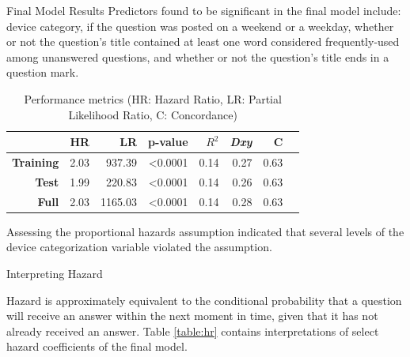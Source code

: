 \documentclass[final]{beamer}
\newlength{\onecolwid}
\newlength{\twocolwid}
\begin{document}
\begin{frame}[t]
\begin{columns}[t]
\begin{column}{\twocolwid}
\begin{columns}[t,totalwidth=\twocolwid]
\begin{column}{\onecolwid}
\begin{block}{Final Model Results}
Predictors found to be significant in the final model include: device category, if the question was posted on a weekend or a weekday, whether or not the question's title contained at least one word considered frequently-used among unanswered questions, and whether or not the question's title ends in a question mark.

\begin{table}[!htbp]
\vspace{3ex}
\begin{tabular}{|r|r|r|r|r|r|r|r|} %
  \hline
  & \textbf{HR} & \textbf{LR} & \textbf{p-value} & \textbf{$R^2$} & \textbf{\textit{Dxy}} & \textbf{C} \\ 
  \hline
  \textbf{Training} & 2.03 & 937.39  & \textless0.0001 & 0.14 & 0.27 & 0.63 \\ 
  \textbf{Test}     & 1.99 & 220.83  & \textless0.0001 & 0.14 & 0.26 & 0.63 \\
  \textbf{Full}     & 2.03 & 1165.03 & \textless0.0001 & 0.14 & 0.28 & 0.63 \\ 
  \hline
\end{tabular}
\caption{Performance metrics (HR: Hazard Ratio, LR: Partial Likelihood Ratio, C: Concordance)} 
\label{table:1}
\end{table}

Assessing the proportional hazards assumption indicated that several levels of the device categorization variable violated the assumption. 

\end{block}


\begin{block}{Interpreting Hazard}

Hazard is approximately equivalent to the conditional probability that a question will receive an answer within the next moment in time, given that it has not already received an answer. Table \ref{table:hr} contains interpretations of select hazard coefficients of the final model.

\end{block}



\end{column}
\end{columns}
\end{column}
\end{columns}
\end{frame}
\end{document}
